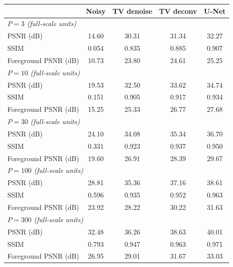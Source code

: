 \begin{tabular}{lcccc}
\toprule
 & Noisy & TV denoise & TV deconv & U-Net \\
\midrule
\multicolumn{5}{l}{\emph{$P=3$ (full-scale units)}} \\
PSNR (dB) & 14.60 & 30.31 & 31.34 & 32.27 \\
SSIM & 0.054 & 0.835 & 0.885 & 0.907 \\
Foreground PSNR (dB) & 10.73 & 23.80 & 24.61 & 25.25 \\
\midrule
\multicolumn{5}{l}{\emph{$P=10$ (full-scale units)}} \\
PSNR (dB) & 19.53 & 32.50 & 33.62 & 34.74 \\
SSIM & 0.151 & 0.905 & 0.917 & 0.934 \\
Foreground PSNR (dB) & 15.25 & 25.33 & 26.77 & 27.68 \\
\midrule
\multicolumn{5}{l}{\emph{$P=30$ (full-scale units)}} \\
PSNR (dB) & 24.10 & 34.08 & 35.34 & 36.70 \\
SSIM & 0.331 & 0.923 & 0.937 & 0.950 \\
Foreground PSNR (dB) & 19.60 & 26.91 & 28.39 & 29.67 \\
\midrule
\multicolumn{5}{l}{\emph{$P=100$ (full-scale units)}} \\
PSNR (dB) & 28.81 & 35.36 & 37.16 & 38.61 \\
SSIM & 0.596 & 0.935 & 0.952 & 0.963 \\
Foreground PSNR (dB) & 23.92 & 28.22 & 30.22 & 31.63 \\
\midrule
\multicolumn{5}{l}{\emph{$P=300$ (full-scale units)}} \\
PSNR (dB) & 32.48 & 36.26 & 38.63 & 40.01 \\
SSIM & 0.793 & 0.947 & 0.963 & 0.971 \\
Foreground PSNR (dB) & 26.95 & 29.01 & 31.67 & 33.03 \\
\bottomrule
\end{tabular}
